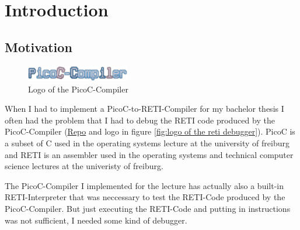 \documentclass{report}
\begin{document}
\fontsize{10pt}{12pt}\selectfont




\tableofcontents
\thispagestyle{empty}
\clearpage
\pagestyle{plain}

\listoffigures
\newpage
\listoftables

\clearpage
{}
\pagestyle{default}

\chapter{Introduction}
\label{sec:introduction}
\section{Motivation}
\label{sec:motivation}

\begin{figure}
	\centering
  \includegraphics[width=0.4\textwidth]{./figures/picoc_compiler.png}
	\caption{Logo of the PicoC-Compiler}
	\label{fig:logo of the picoc compiler}
\end{figure}

When I had to implement a PicoC-to-RETI-Compiler for my bachelor thesis I often had the problem that I had to debug the RETI code produced by the \alert{PicoC-Compiler} (\href{https://github.com/matthejue/PicoC-Compiler/tree/missing_semester_project}{Repo} and logo in figure \ref{fig:logo of the reti debugger}). \alert{PicoC} is a subset of C used in the operating systems lecture at the university of freiburg and \alert{RETI} is an assembler used in the operating systems and technical computer science lectures at the univeristy of freiburg. 

The PicoC-Compiler I implemented for the lecture has actually also a built-in \alert{RETI-Interpreter} that was neccessary to test the RETI-Code produced by the PicoC-Compiler. But just executing the RETI-Code and putting in  instructions was not sufficient, I needed some kind of debugger. 
\end{document}
